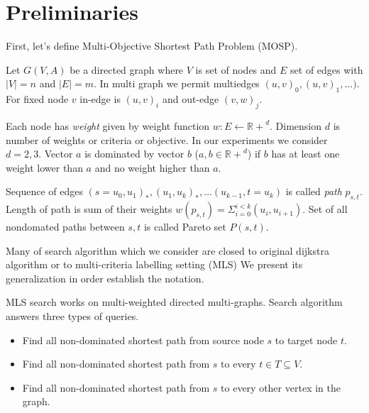 
\section{Preliminaries}
\label{secPreliminaries}


First, let's define Multi-Objective Shortest Path Problem (MOSP).

Let $G(V,A)$ be a directed graph where $V$ is set of nodes and $E$ set
of edges with $|V| = n$ and $|E| = m$. In multi graph we permit multiedges
$(u,v)_0,(u,v)_1,\dots)$. For fixed node $v$ in-edge is $(u,v)_i$ and out-edge
$(v,w)_j$.

Each node has \emph{weight} given by weight function
$w: E \leftarrow \mathbb{R+}^d$.
Dimension $d$ is number of weights or criteria or objective. 
In our experiments we consider $d=2,3$.
Vector $a$ is dominated by vector $b$ ($a,b \in \mathbb{R+}^d$) if
$b$ has at least one weight lower than $a$ and no weight higher than $a$.

Sequence of edges $(s=u_0,u_1)_*,(u_1,u_k)_*,\dots(u_{k-1},t=u_k)$ is called
\emph{path} $p_{s,t}$. Length of path is sum of their weights 
$w(p_{s,t}) = \Sigma_{i=0}^{i<k} (u_i,u_{i+1})$.
Set of all nondomated paths between $s,t$ is called Pareto set
$P(s,t)$.



Many of search algorithm which we consider
are closed to original dijkstra algorithm \cite{dijkstra1959note}
or to multi-criteria labelling setting (MLS) \cite{martins1984multicriteria}
We present its generalization in order establish the notation.

MLS search works on multi-weighted directed multi-graphs. 
Search algorithm answers three types of queries.
\begin{itemize}
\item Find all non-dominated shortest path from source node $s$ to target node $t$.
\item Find all non-dominated shortest path from $s$ to every $t \in T \subseteq V$.
\item Find all non-dominated shortest path from $s$ to every other vertex in the graph.
\end{itemize}

